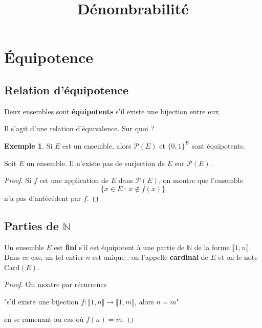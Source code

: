\documentclass[french]{article}
\title{Dénombrabilité}
\date{}
\newcommand{\N}{\mathbb{N}}
\newcommand{\card}{\text{Card}}
\theoremstyle{plain}
\theoremstyle{definition}
\newtheorem*{ex}{Exemple}
\theoremstyle{remark}
\begin{document}
\tableofcontents

\newpage
\maketitle

\section{Équipotence}

\subsection{Relation d'équipotence}

\begin{dfn}
	Deux ensembles sont \textbf{équipotents} s'il existe une bijection entre eux.
\end{dfn}
Il s'agit d'une relation d'équivalence. Sur quoi ?

\begin{ex}
	Si $E$ est un ensemble, alors $\mathcal{P}(E)$ et $\{0,1\}^E$ sont équipotents.
\end{ex}

\begin{prop}%
	Soit $E$ un ensemble. Il n'existe pas de surjection de $E$ sur $\mathcal{P}(E)$.
\end{prop}
\begin{proof}
	Si $f$ est une application de $E$ dans $\mathcal{P}(E)$, on montre que l'ensemble $$\{x\in E\ : \ x\notin f(x)\}$$ n'a pas d'antécédent par $f$.
\end{proof}

\subsection{Parties de $\N$}

\begin{dfn}
	Un ensemble $E$ est \textbf{fini} s'il est équipotent à une partie de $\N$ de la forme $\llbracket1,n\rrbracket$. Dans ce cas, un tel entier $n$ est unique : on l'appelle \textbf{cardinal} de $E$ et on le note $\card(E)$.
\end{dfn}
\begin{proof}
	On montre par récurrence \begin{center}
		"s'il existe une bijection $f:\llbracket1,n\rrbracket\to\llbracket1,m\rrbracket$, alors $n=m$"
	\end{center} en se ramenant au cas où $f(n)=m$.
\end{proof}
\end{document}

